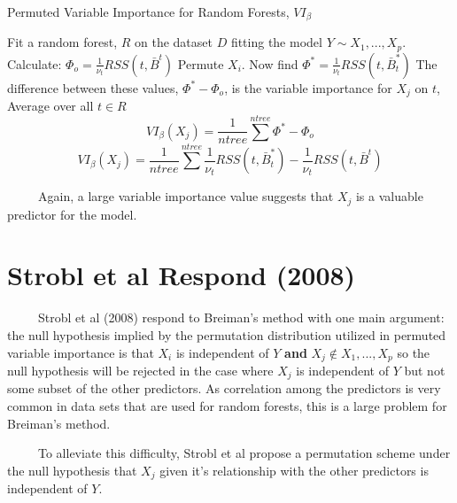 \documentclass[12pt,twoside]{reedthesis}
\begin{document}
  \begin{algorithm}
  \caption{Permuted Variable Importance for Random Forests, $VI_{\beta}$}
  \label{breiman}
  \begin{algorithmic}
  \State Fit a random forest, $R$ on the dataset $D$ fitting the model $Y \sim X_1,...,X_p$.
  \State Calculate: $\Phi_o =  \frac 1 {\nu_t} RSS(t,\bar{B}^t)$
  \State Permute $X_i$. Now find $\Phi^* =  \frac 1 {\nu_t} RSS(t,\bar{B}_t^*)$
  \State The difference between these values, $\Phi^* - \Phi_o$,  is the variable importance for $X_j$ on $t$,  
  \EndFor
  \State Average over all $t \in R$ 
   $$VI_{\beta}(X_j) = \frac 1 {ntree} \sum^{ntree} \Phi^* - \Phi_o$$
   $$VI_{\beta}(X_j) = \frac 1 {ntree} \sum^{ntree} \frac 1 {\nu_t} RSS(t,\bar{B}_t^*) - \frac 1 {\nu_t} RSS(t,\bar{B}^t)$$
  \EndFor
  \end{algorithmic}
  \end{algorithm}
  
  ~~~~~Again, a large variable importance value suggests that \(X_j\) is a
  valuable predictor for the model.
  
  \section{Strobl et al Respond (2008)}\label{strobl-et-al-respond-2008}
  
  ~~~~~Strobl et al (2008) respond to Breiman's method with one main
  argument: the null hypothesis implied by the permutation distribution
  utilized in permuted variable importance is that \(X_i\) is independent
  of \(Y\) \textbf{and} \({X_j \notin X_1,...,X_p}\) so the null
  hypothesis will be rejected in the case where \(X_j\) is independent of
  \(Y\) but not some subset of the other predictors. As correlation among
  the predictors is very common in data sets that are used for random
  forests, this is a large problem for Breiman's method.
  
  ~~~~~To alleviate this difficulty, Strobl et al propose a permutation
  scheme under the null hypothesis that \(X_j\) given it's relationship
  with the other predictors is independent of \(Y\).
  
\end{document}
